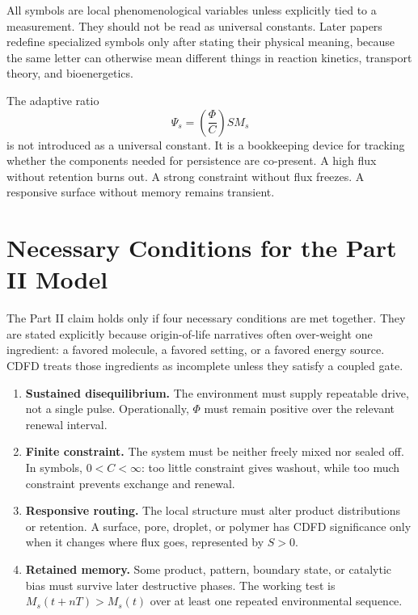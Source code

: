 \documentclass[11pt,a4paper]{article}
\begin{document}
All symbols are local phenomenological variables unless explicitly tied to a measurement. They should not be read as universal constants. Later papers redefine specialized symbols only after stating their physical meaning, because the same letter can otherwise mean different things in reaction kinetics, transport theory, and bioenergetics.

The adaptive ratio
\begin{equation}
 \Psi_s=\left(\frac{\Phi}{C}\right)S M_s
 \label{eq:psi}
\end{equation}
is not introduced as a universal constant. It is a bookkeeping device for tracking whether the components needed for persistence are co-present. A high flux without retention burns out. A strong constraint without flux freezes. A responsive surface without memory remains transient.

\section{Necessary Conditions for the Part II Model}
The Part II claim holds only if four necessary conditions are met together.
They are stated explicitly because origin-of-life narratives often over-weight
one ingredient: a favored molecule, a favored setting, or a favored energy
source. CDFD treats those ingredients as incomplete unless they satisfy a
coupled gate.

\begin{enumerate}
 \item \textbf{Sustained disequilibrium.} The environment must supply
 repeatable drive, not a single pulse. Operationally, $\Phi$ must remain
 positive over the relevant renewal interval.
 \item \textbf{Finite constraint.} The system must be neither freely mixed
 nor sealed off. In symbols, $0<C<\infty$: too little constraint gives
 washout, while too much constraint prevents exchange and renewal.
 \item \textbf{Responsive routing.} The local structure must alter product
 distributions or retention. A surface, pore, droplet, or polymer has CDFD
 significance only when it changes where flux goes, represented by $S>0$.
 \item \textbf{Retained memory.} Some product, pattern, boundary state, or
 catalytic bias must survive later destructive phases. The working test is
 $M_s(t+nT)>M_s(t)$ over at least one repeated environmental sequence.
\end{enumerate}
\end{document}
